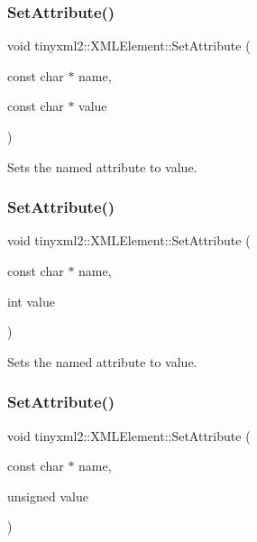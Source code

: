 \subsubsection{\texorpdfstring{Set\+Attribute()}{SetAttribute()}\hspace{0.1cm}{\footnotesize\ttfamily [1/7]}}
{\footnotesize\ttfamily void tinyxml2\+::\+X\+M\+L\+Element\+::\+Set\+Attribute (\begin{DoxyParamCaption}\item[{const char $\ast$}]{name,  }\item[{const char $\ast$}]{value }\end{DoxyParamCaption})\hspace{0.3cm}{\ttfamily [inline]}}



Sets the named attribute to value. 

\mbox{\label{classtinyxml2_1_1_x_m_l_element_aae6568c64c7f1cc88be8461ba41a79cf}} 
\subsubsection{\texorpdfstring{Set\+Attribute()}{SetAttribute()}\hspace{0.1cm}{\footnotesize\ttfamily [2/7]}}
{\footnotesize\ttfamily void tinyxml2\+::\+X\+M\+L\+Element\+::\+Set\+Attribute (\begin{DoxyParamCaption}\item[{const char $\ast$}]{name,  }\item[{int}]{value }\end{DoxyParamCaption})\hspace{0.3cm}{\ttfamily [inline]}}



Sets the named attribute to value. 

\mbox{\label{classtinyxml2_1_1_x_m_l_element_ae143997e90064ba82326b29a9930ea8f}} 
\subsubsection{\texorpdfstring{Set\+Attribute()}{SetAttribute()}\hspace{0.1cm}{\footnotesize\ttfamily [3/7]}}
{\footnotesize\ttfamily void tinyxml2\+::\+X\+M\+L\+Element\+::\+Set\+Attribute (\begin{DoxyParamCaption}\item[{const char $\ast$}]{name,  }\item[{unsigned}]{value }\end{DoxyParamCaption})\hspace{0.3cm}{\ttfamily [inline]}}



